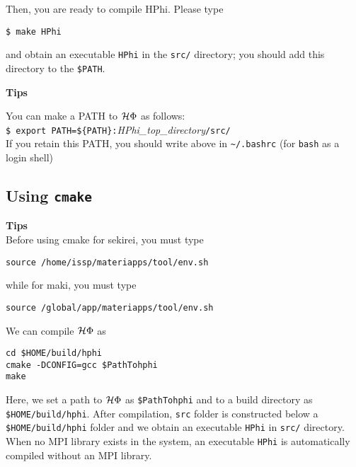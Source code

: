 Then, you are ready to compile HPhi.
Please type
\begin{verbatim}
$ make HPhi
\end{verbatim}
and obtain an executable \verb|HPhi| in the \verb|src/| directory;
you should add this directory to the \verb|$PATH|.



\begin{screen}
\Large 
{\bf Tips}
\normalsize

You can make a PATH to $\mathcal{H} \Phi$ as follows:
\\
\verb|$ export PATH=${PATH}:|\textit{HPhi\_top\_directory}\verb|/src/|
\\
If you retain this PATH, you should write above in \verb|~/.bashrc|
(for \verb|bash| as a login shell)

\end{screen}


\subsection{Using \texttt{cmake}}

\begin{screen}
\Large 
{\bf Tips}
\normalsize\\
Before using cmake for sekirei, you must type 
\begin{verbatim}
source /home/issp/materiapps/tool/env.sh
\end{verbatim}
while for maki, you must type
\begin{verbatim}
source /global/app/materiapps/tool/env.sh
\end{verbatim}
\end{screen}

We can compile $\mathcal{H} \Phi$ as
\begin{verbatim}
cd $HOME/build/hphi
cmake -DCONFIG=gcc $PathTohphi
make
\end{verbatim}
Here, we set a path to $\mathcal{H} \Phi$ as \verb|$PathTohphi|
and to a build directory as \verb| $HOME/build/hphi|.
After compilation, \verb|src| folder is constructed below a \verb|$HOME/build/hphi|
folder and we obtain an executable \verb|HPhi| in \verb|src/| directory.
When no MPI library exists in the system, an executable \verb|HPhi|
is automatically compiled without an MPI library.

